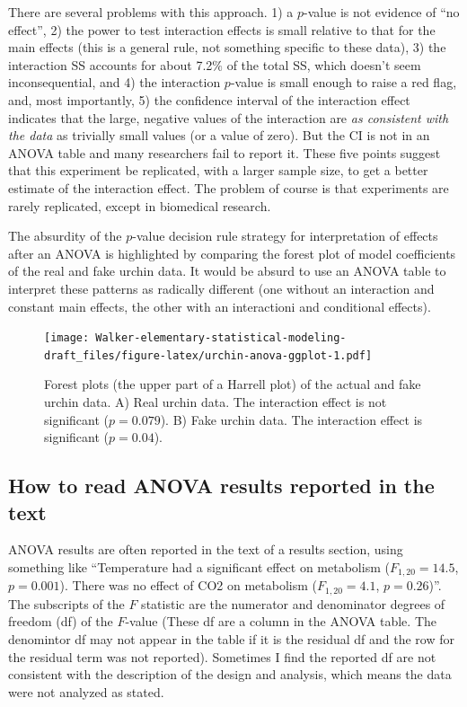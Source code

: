 \documentclass[]{book}
\begin{document}
There are several problems with this approach. 1) a \(p\)-value is not evidence of ``no effect'', 2) the power to test interaction effects is small relative to that for the main effects (this is a general rule, not something specific to these data), 3) the interaction SS accounts for about 7.2\(\%\) of the total SS, which doesn't seem inconsequential, and 4) the interaction \(p\)-value is small enough to raise a red flag, and, most importantly, 5) the confidence interval of the interaction effect indicates that the large, negative values of the interaction are \emph{as consistent with the data} as trivially small values (or a value of zero). But the CI is not in an ANOVA table and many researchers fail to report it. These five points suggest that this experiment be replicated, with a larger sample size, to get a better estimate of the interaction effect. The problem of course is that experiments are rarely replicated, except in biomedical research.

The absurdity of the \(p\)-value decision rule strategy for interpretation of effects after an ANOVA is highlighted by comparing the forest plot of model coefficients of the real and fake urchin data. It would be absurd to use an ANOVA table to interpret these patterns as radically different (one without an interaction and constant main effects, the other with an interactioni and conditional effects).

\begin{figure}
\centering
\texttt{[image: Walker-elementary-statistical-modeling-draft\_files/figure-latex/urchin-anova-ggplot-1.pdf]}
\caption{\label{fig:urchin-anova-ggplot}Forest plots (the upper part of a Harrell plot) of the actual and fake urchin data. A) Real urchin data. The interaction effect is not significant (\(p=0.079\)). B) Fake urchin data. The interaction effect is significant (\(p=0.04\)).}
\end{figure}

\hypertarget{how-to-read-anova-results-reported-in-the-text}{%
\subsection{How to read ANOVA results reported in the text}\label{how-to-read-anova-results-reported-in-the-text}}

ANOVA results are often reported in the text of a results section, using something like ``Temperature had a significant effect on metabolism (\(F_{1,20} = 14.5\), \(p=0.001\)). There was no effect of CO2 on metabolism (\(F_{1,20} = 4.1\), \(p=0.26\))''. The subscripts of the \(F\) statistic are the numerator and denominator degrees of freedom (df) of the \(F\)-value (These df are a column in the ANOVA table. The denomintor df may not appear in the table if it is the residual df and the row for the residual term was not reported). Sometimes I find the reported df are not consistent with the description of the design and analysis, which means the data were not analyzed as stated.
\end{document}
